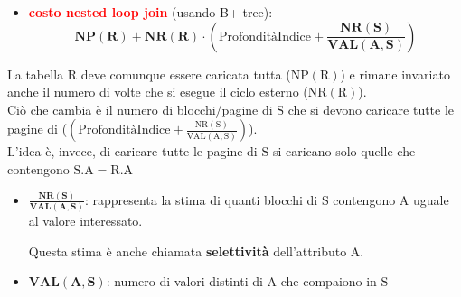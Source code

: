 \begin{itemize}[label=$\Rightarrow$, itemsep=\smallskipamount]
    \item \textcolor{red}{\textbf{costo nested loop join}} (usando B+ tree):
    \[
        \mathbf{NP(R) + NR(R)} \cdot \left(\text{ProfonditàIndice} + \mathbf{\frac{NR(S)}{VAL(A,S)}}\right)
    \]
\end{itemize}

La tabella $\mathrm{R}$ deve comunque essere caricata tutta ($\mathrm{NP(R)}$) e rimane invariato anche il numero di volte che si esegue il ciclo esterno ($\mathrm{NR(R)}$).\\[0.2ex]
Ciò che cambia è il numero di blocchi/pagine di $\mathrm{S}$ che si devono caricare tutte le pagine di ($\left(\text{ProfonditàIndice} + \mathrm{\frac{NR(S)}{VAL(A,S)}}\right)$).\\[0.2ex]
L'idea è, invece, di caricare tutte le pagine di $\mathrm{S}$ si caricano solo quelle che contengono $\mathrm{S.A = R.A}$
\begin{itemize}[label=$\diamond$, itemsep=\smallskipamount]
    \item $\mathbf{\frac{NR(S)}{VAL(A,S)}}$: rappresenta la stima di quanti blocchi di $\mathrm{S}$ contengono $\mathrm{A}$ uguale al valore interessato.
    
    Questa stima è anche chiamata \textbf{selettività} dell'attributo $\mathrm{A}$.
    \item $\mathbf{VAL(A,S)}$: numero di valori distinti di $\mathrm{A}$ che compaiono in $\mathrm{S}$
\end{itemize}


